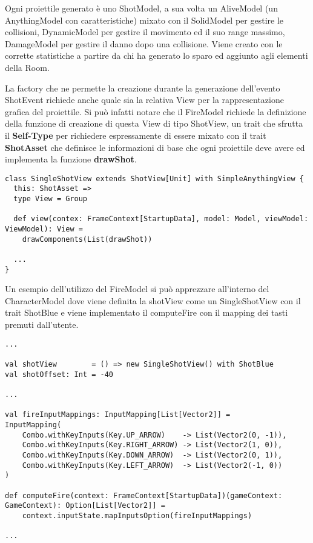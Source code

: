 Ogni proiettile generato è uno ShotModel, a sua volta un AliveModel (un AnythingModel con caratteristiche) mixato con 
il SolidModel per gestire le collisioni, DynamicModel per gestire il movimento ed il suo range massimo, DamageModel per gestire il danno dopo una collisione.
Viene creato con le corrette statistiche a partire da chi ha generato lo sparo ed aggiunto agli elementi della Room.

La factory che ne permette la creazione durante la generazione dell'evento ShotEvent 
richiede anche quale sia la relativa View per la rappresentazione grafica del proiettile.
Si può infatti notare che il FireModel richiede la definizione della funzione di creazione di questa View di tipo ShotView, 
un trait che sfrutta il \textbf{Self-Type} per richiedere espressamente di essere mixato 
con il trait \textbf{ShotAsset} che definisce le informazioni di base che ogni proiettile deve avere ed implementa la funzione \textbf{drawShot}.

\begin{lstlisting}[basicstyle=\tiny]
class SingleShotView extends ShotView[Unit] with SimpleAnythingView {
  this: ShotAsset =>
  type View = Group

  def view(contex: FrameContext[StartupData], model: Model, viewModel: ViewModel): View =
    drawComponents(List(drawShot))

  ...
}
\end{lstlisting}

Un esempio dell'utilizzo del FireModel si può apprezzare all'interno del CharacterModel 
dove viene definita la shotView come un SingleShotView con il trait ShotBlue
e viene implementato il computeFire con il mapping dei tasti premuti dall'utente.

\begin{lstlisting}[basicstyle=\tiny]
...

val shotView        = () => new SingleShotView() with ShotBlue
val shotOffset: Int = -40

...

val fireInputMappings: InputMapping[List[Vector2]] =
InputMapping(
	Combo.withKeyInputs(Key.UP_ARROW)    -> List(Vector2(0, -1)),
	Combo.withKeyInputs(Key.RIGHT_ARROW) -> List(Vector2(1, 0)),
	Combo.withKeyInputs(Key.DOWN_ARROW)  -> List(Vector2(0, 1)),
	Combo.withKeyInputs(Key.LEFT_ARROW)  -> List(Vector2(-1, 0))
)

def computeFire(context: FrameContext[StartupData])(gameContext: GameContext): Option[List[Vector2]] =
	context.inputState.mapInputsOption(fireInputMappings)
	
...
\end{lstlisting}

